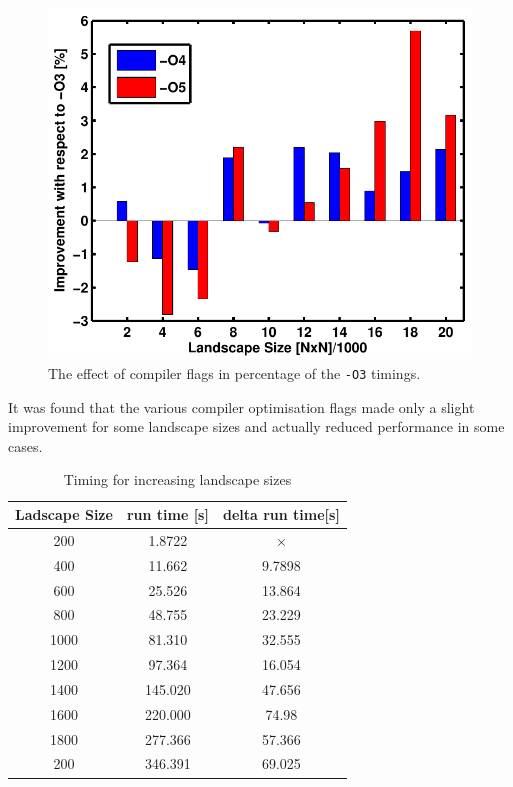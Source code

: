 \begin{figure}
\begin{center}
 \includegraphics[scale=0.8]{Figures/Timing_Barchart_compflags.pdf}
\caption{The effect of compiler flags in percentage of the \texttt{-O3} timings.}
\label{fig: Comp flags bahart}
\end{center}
\end{figure}

It was found that the various compiler optimisation flags made only a slight improvement for some landscape sizes and actually reduced performance in some cases.


\begin{table}
\caption{Timing for increasing landscape sizes}
\label{tab: Size timing}
 \begin{center}
\begin{tabular}{|c|c|c|}
\hline
Ladscape Size & run time [s] & delta run time[s]\\
\hline
200 & 1.8722 & ×\\
\hline
400 & 11.662 & 9.7898\\
\hline
600 & 25.526 & 13.864\\
\hline
800 & 48.755 & 23.229\\
\hline
1000 & 81.310 & 32.555\\
\hline
1200 & 97.364 & 16.054\\
\hline
1400 & 145.020 & 47.656\\
\hline
1600 & 220.000 & 74.98\\
\hline
1800 & 277.366 & 57.366\\
\hline
200 & 346.391 & 69.025\\
\hline
\end{tabular}
\end{center}
\end{table}

